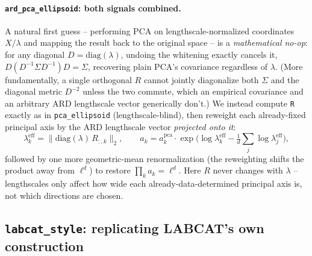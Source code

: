 \documentclass[11pt]{article}
\begin{document}
\paragraph{\texttt{ard\_pca\_ellipsoid}: both signals combined.} A natural
first guess -- performing PCA on lengthscale-normalized coordinates
$X/\lambda$ and mapping the result back to the original space -- is a
\emph{mathematical no-op}: for any diagonal $D = \mathrm{diag}(\lambda)$,
undoing the whitening exactly cancels it,
$D(D^{-1}\Sigma D^{-1})D = \Sigma$, recovering plain PCA's covariance
regardless of $\lambda$. (More fundamentally, a single orthogonal $R$
cannot jointly diagonalize both $\Sigma$ and the diagonal metric $D^{-2}$
unless the two commute, which an empirical covariance and an arbitrary ARD
lengthscale vector generically don't.) We instead compute \texttt{R} exactly
as in \texttt{pca\_ellipsoid} (lengthscale-blind), then reweight each
already-fixed principal axis by the ARD lengthscale vector \emph{projected
onto it}:
\begin{equation}
  \lambda^{\mathrm{eff}}_k = \big\lVert \mathrm{diag}(\lambda)\, R_{:,k} \big\rVert_2,
  \qquad
  a_k = a^{\mathrm{pca}}_k \cdot \exp\!\Big(\log \lambda^{\mathrm{eff}}_k - \tfrac{1}{d}\textstyle\sum_j \log \lambda^{\mathrm{eff}}_j\Big),
\end{equation}
followed by one more geometric-mean renormalization (the reweighting shifts
the product away from $\ell^d$) to restore $\prod_k a_k = \ell^d$. Here
$R$ never changes with $\lambda$ -- lengthscales only affect how wide each
already-data-determined principal axis is, not which directions are chosen.

\subsection{\texttt{labcat\_style}: replicating LABCAT's own construction}
\label{sec:labcat-style}
\end{document}
